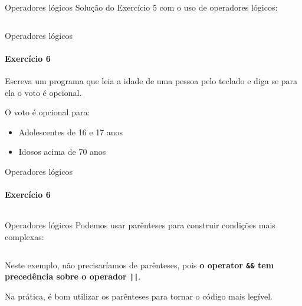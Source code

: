 \documentclass{beamer}
\begin{document}
\begin{frame}{Operadores lógicos}
	Solução do Exercício 5 com o uso de operadores lógicos:
	\inputminted[fontsize=\footnotesize]{c}{resources/logicops.c}
\end{frame}
\begin{frame}{Operadores lógicos}
	\framesubtitle{Exercício 6}
	Escreva um programa que leia a idade de uma pessoa pelo teclado e diga se para ela o voto é opcional.
	
	O voto é opcional para:
	\begin{itemize}
		\item Adolescentes de 16 e 17 anos
		\item Idosos acima de 70 anos
	\end{itemize}
\end{frame}
\begin{frame}{Operadores lógicos}
	\framesubtitle{Exercício 6}
	\inputminted[fontsize=\scriptsize]{c}{resources/ex6.c}
\end{frame}
\begin{frame}{Operadores lógicos}
	Podemos usar parênteses para construir condições mais complexas:
	\inputminted[firstline=8,lastline=8]{c}{resources/ex6.c}
	Neste exemplo, não precisaríamos de parênteses, pois \textbf{o operator \alert{\texttt{\&\&}} tem precedência sobre o operador \alert{\texttt{||}}}.
	
	Na prática, é bom utilizar os parênteses para tornar o código mais legível.
\end{frame}
\end{document}
